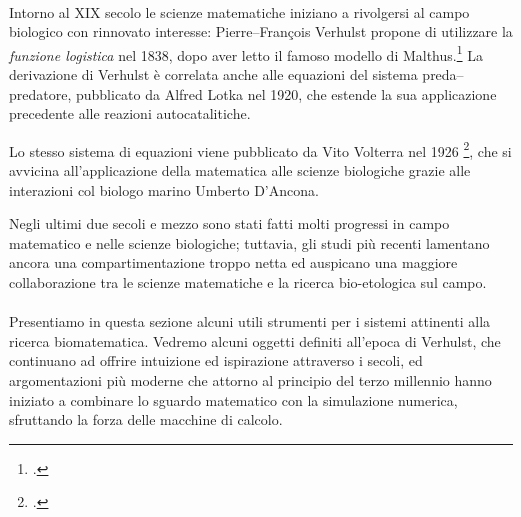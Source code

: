 \paragraph{}
Intorno al XIX secolo le scienze matematiche iniziano a rivolgersi al campo biologico con rinnovato interesse:
Pierre--François Verhulst propone di utilizzare la \emph{funzione logistica} nel 1838, dopo aver letto il famoso
modello di Malthus.\footcite{malthus1986essay}
La derivazione di Verhulst è correlata anche alle equazioni del sistema preda--predatore, pubblicato da Alfred
Lotka nel 1920, che estende la sua applicazione precedente alle reazioni autocatalitiche.

Lo stesso sistema di equazioni viene pubblicato da Vito Volterra nel 1926
\footcite{vito},
che si avvicina all'applicazione della matematica alle scienze biologiche grazie alle interazioni col
biologo marino Umberto D'Ancona.

Negli ultimi due secoli e mezzo sono stati fatti molti progressi in campo matematico e nelle scienze biologiche;
tuttavia, gli studi più recenti lamentano ancora una compartimentazione troppo netta ed auspicano una maggiore
collaborazione tra le scienze matematiche e la ricerca bio-etologica sul campo.

\paragraph{}
Presentiamo in questa sezione alcuni utili strumenti per i sistemi attinenti alla ricerca biomatematica.
Vedremo alcuni oggetti definiti all'epoca di Verhulst, che continuano ad offrire intuizione ed ispirazione
attraverso i secoli, ed argomentazioni più moderne che attorno al principio del terzo millennio hanno iniziato
a combinare lo sguardo matematico con la simulazione numerica, sfruttando la forza delle macchine di calcolo.



